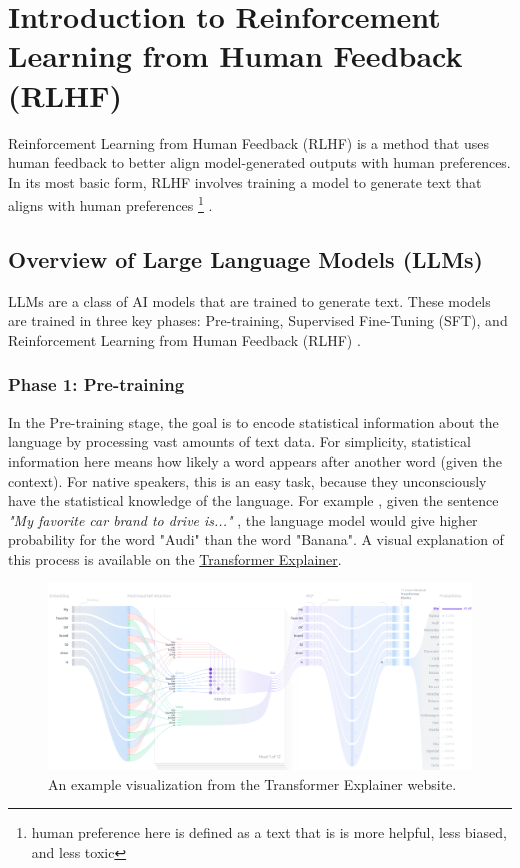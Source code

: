 \section{Introduction to Reinforcement Learning from Human Feedback (RLHF)}
\label{sec:intro-rlhf}

Reinforcement Learning from Human Feedback (RLHF) is a method that 
uses human feedback to better align model-generated outputs with human preferences. 
In its most basic form, RLHF involves training a model to generate text that aligns with human 
preferences \footnote{human preference here is defined as a text that is 
is more helpful, less biased, and less toxic} \cite{ouyangTrainingLanguageModels2022, zhengSecretsRLHFLarge2023, 
yangFoundationModelsDecision2023}.

\subsection{Overview of Large Language Models (LLMs)} \label{subsec:llms}

LLMs are a class of AI models that are trained to generate text. These models
are trained in three key phases: Pre-training, Supervised Fine-Tuning (SFT), and 
Reinforcement Learning from Human Feedback (RLHF) \cite{ouyangTrainingLanguageModels2022}.

\subsubsection{Phase 1: Pre-training} \label{subsubsec:pre-training}

In the Pre-training stage, the goal is to encode statistical information about the language by processing 
vast amounts of text data. For simplicity, statistical information here means how 
likely a word appears after another word (given the context).
For native speakers, this is an easy task, because they unconsciously have the statistical knowledge
of the language. For example , given the sentence  \textit{"My favorite car brand to drive is..."
}, the language model would give higher probability for the word "Audi" than the word "Banana".
A visual explanation of this process is available on the \href{https://poloclub.github.io/transformer-explainer/}
{Transformer Explainer}.

\begin{figure}[h]
    \centering
    \includegraphics[width=1\textwidth]{./figures/transformer.png}
    \caption{An example visualization from the Transformer Explainer website.}
    \label{fig:transformer-explainer}
\end{figure}

